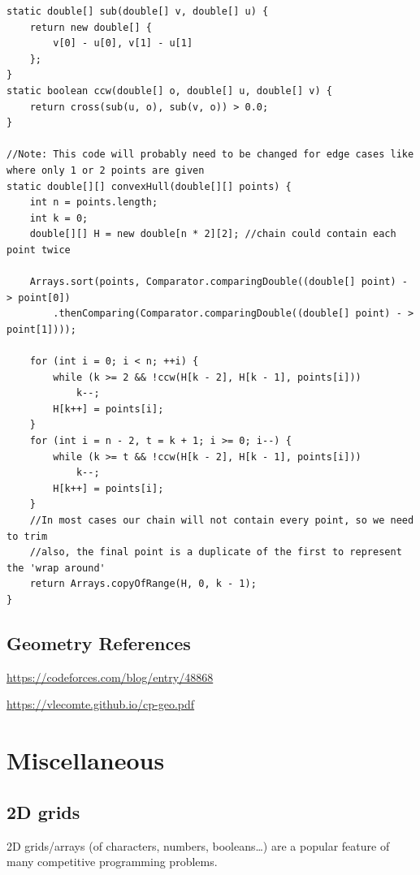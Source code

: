 \documentclass[10pt]{book}
\newif\iftodos
\newcommand{\todo}[1]{\iftodos\textcolor{red}{[TODO: #1]}\fi}
\begin{document}
\begin{verbatim}
static double[] sub(double[] v, double[] u) {
    return new double[] {
        v[0] - u[0], v[1] - u[1]
    };
}
static boolean ccw(double[] o, double[] u, double[] v) {
    return cross(sub(u, o), sub(v, o)) > 0.0;
}

//Note: This code will probably need to be changed for edge cases like where only 1 or 2 points are given
static double[][] convexHull(double[][] points) {
    int n = points.length;
    int k = 0;
    double[][] H = new double[n * 2][2]; //chain could contain each point twice

    Arrays.sort(points, Comparator.comparingDouble((double[] point) - > point[0])
        .thenComparing(Comparator.comparingDouble((double[] point) - > point[1])));

    for (int i = 0; i < n; ++i) {
        while (k >= 2 && !ccw(H[k - 2], H[k - 1], points[i]))
            k--;
        H[k++] = points[i];
    }
    for (int i = n - 2, t = k + 1; i >= 0; i--) {
        while (k >= t && !ccw(H[k - 2], H[k - 1], points[i]))
            k--;
        H[k++] = points[i];
    }
    //In most cases our chain will not contain every point, so we need to trim
    //also, the final point is a duplicate of the first to represent the 'wrap around'
    return Arrays.copyOfRange(H, 0, k - 1);
}
\end{verbatim}


\todo{Inside/outside testing.}

\section{Geometry References}

\url{https://codeforces.com/blog/entry/48868}

\url{https://vlecomte.github.io/cp-geo.pdf}

\chapter{Miscellaneous}

\section{2D grids}

2D grids/arrays (of characters, numbers, booleans\dots) are a popular
feature of many competitive programming problems.
\end{document}
